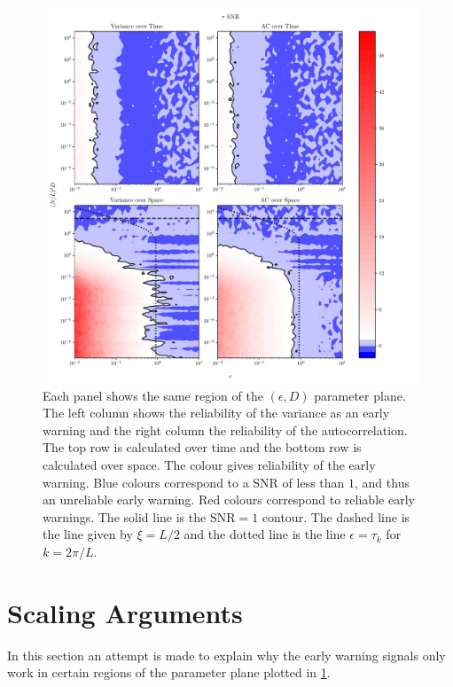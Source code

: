 \begin{figure}
  \centering
  \includegraphics[width=\textwidth,keepaspectratio]{parameter_plane}
  \caption[The quality of early warning signals in the $\epsilon$ and $D$ plane]{Each panel shows the same region of the $(\epsilon,D)$ parameter plane. The left column shows the
    reliability of the variance as an early warning and the right column the reliability of the autocorrelation. The top row is calculated over time and the bottom row is calculated over space.
    The colour gives reliability of the early warning. Blue colours correspond to a SNR of less than $1$, and thus an unreliable early warning. Red colours correspond to reliable early warnings.
    The solid line is the $\mathrm{SNR} = 1$ contour. The dashed line is the line given by $\xi = L/2$ and the dotted line  is the line $\epsilon = \tau_k$ for $k = 2\pi/L$.}
  \label{fig:parameter_plane}
\end{figure}


\section{Scaling Arguments}
\label{sec:scaling_arguments}
    
In this section an attempt is made to explain why the early warning signals only work in certain regions of the parameter plane plotted in \cref{fig:parameter_plane}.

